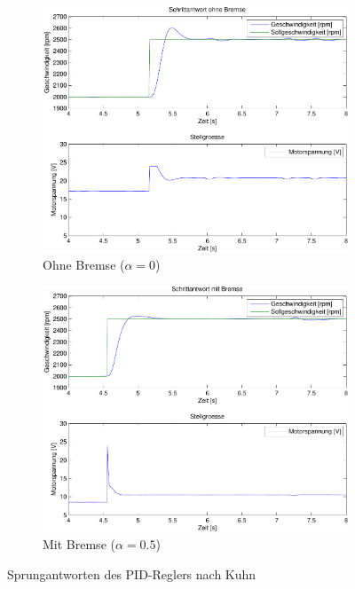 \begin{figure}[h!]
	\centering
	\begin{subfigure}{0.475\textwidth}
		\includegraphics[width=1\textwidth]{09/step_noload.pdf}
		\caption{Ohne Bremse ($\alpha = 0$)}
	\end{subfigure}
	\hfill{}
	\begin{subfigure}{0.475\textwidth}
		\includegraphics[width=1\textwidth]{09/step_load.pdf}
		\caption{Mit Bremse ($\alpha = 0.5$)}
	\end{subfigure}
	\caption{Sprungantworten des PID-Reglers nach Kuhn}
\end{figure}


